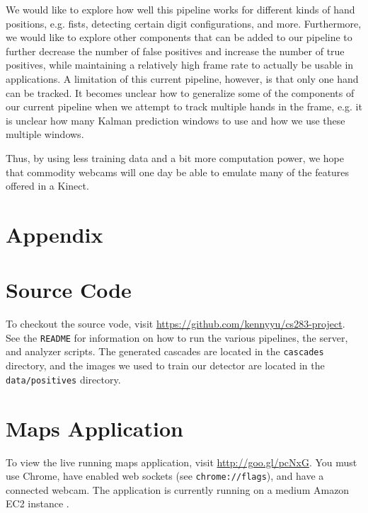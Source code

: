 \documentclass[12pt]{article}
\begin{document}
We would like to explore how well this pipeline works for different kinds of hand positions, e.g. fists, detecting certain digit configurations, and more. Furthermore, we would like to explore other components that can be added to our pipeline to further decrease the number of false positives and increase the number of true positives, while maintaining a relatively high frame rate to actually be usable in applications. A limitation of this current pipeline, however, is that only one hand can be tracked. It becomes unclear how to generalize some of the components of our current pipeline when we attempt to track multiple hands in the frame, e.g. it is unclear how many Kalman prediction windows to use and how we use these multiple windows.

Thus, by using less training data and a bit more computation power, we hope that commodity webcams will one day be able to emulate many of the features offered in a Kinect.

\section{Appendix}

\appendix
\section{Source Code}
\label{sourcecode}
To checkout the source vode, visit \url{https://github.com/kennyyu/cs283-project}. See the \texttt{README} for information on how to run the various pipelines, the server, and analyzer scripts. The generated cascades are located in the \texttt{cascades} directory, and the images we used to train our detector are located in the \texttt{data/positives} directory.

\section{Maps Application}
\label{mapsapp}
To view the live running maps application, visit \url{http://goo.gl/pcNxG}. You must use Chrome, have enabled web sockets (see \texttt{chrome://flags}), and have a connected webcam. The application is currently running on a medium Amazon EC2 instance \cite{ec2}.
\end{document}
